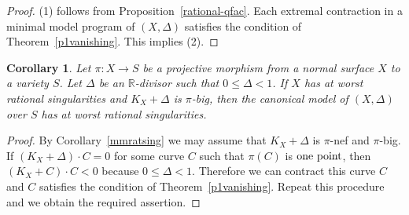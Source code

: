 \documentclass[12pt,twoside]{amsart}
\newtheorem{cor}[thm]{Corollary}
\theoremstyle{definition}
\newtheorem{ques}[thm]{Question}
\begin{document}
\begin{proof}
(1) follows from Proposition~\ref{rational-qfac}. 
Each extremal contraction in a minimal model program of $(X, \Delta)$ 
satisfies the condition of Theorem~\ref{p1vanishing}. 
This implies (2). 
\end{proof}


\begin{cor}\label{cmratsing}
Let $\pi:X \to S$ be a projective morphism from 
a normal surface $X$ to a variety $S$. 
Let $\Delta$ be an $\mathbb{R}$-divisor such that 
$0\leq \Delta<1$. 
If $X$ has at worst rational singularities and $K_X+\Delta$ is $\pi$-big, 
then the canonical model of $(X, \Delta)$ over $S$ 
has at worst rational singularities.
\end{cor}

\begin{proof}
By Corollary~\ref{mmratsing} we may assume that 
$K_X+\Delta$ is $\pi$-nef and $\pi$-big. 
If $(K_X+\Delta)\cdot C=0$ for some curve $C$ such that $\pi(C)$ is ${\rm one\,\,point}$, 
then $(K_X+C)\cdot C<0$ because $0\leq \Delta<1$. 
Therefore we can contract this curve $C$ and 
$C$ satisfies the condition of Theorem~\ref{p1vanishing}. 
Repeat this procedure and 
we obtain the required assertion. 
\end{proof}


\end{document}
